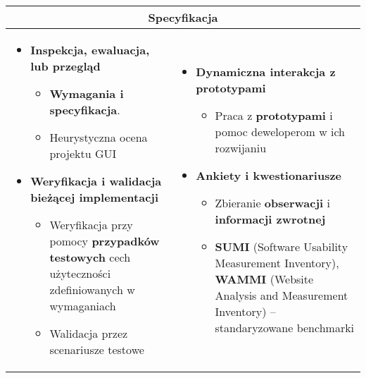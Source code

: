 \documentclass[../main.tex]{subfiles}
\begin{document}
    \begin{table}[H]
        \begin{center}
            \begin{tabular}{| p{8cm} | p{8cm} |}
                \hline
                \multicolumn{2}{|c|}{\textbf{Specyfikacja}} \\
                \hline
                \begin{itemize}
                    \item \textbf{Inspekcja, ewaluacja, lub przegląd}
                    \begin{itemize}
                        \item \textbf{Wymagania i specyfikacja}.
                        \item Heurystyczna ocena projektu GUI
                    \end{itemize}

                    \item \textbf{Weryfikacja i walidacja bieżącej implementacji}
                    \begin{itemize}
                        \item Weryfikacja przy pomocy \textbf{przypadków testowych} cech użyteczności
                        zdefiniowanych w wymaganiach
                        \item Walidacja przez scenariusze testowe
                    \end{itemize}
                \end{itemize}
                &
                \begin{itemize}
                    \item \textbf{Dynamiczna interakcja z prototypami}
                    \begin{itemize}
                        \item Praca z \textbf{prototypami} i pomoc deweloperom w ich rozwijaniu
                    \end{itemize}

                    \item \textbf{Ankiety i kwestionariusze}
                    \begin{itemize}
                        \item Zbieranie \textbf{obserwacji} i \textbf{informacji zwrotnej}
                        \item \textbf{SUMI} (Software Usability Measurement Inventory), \textbf{WAMMI} (Website Analysis and Measurement Inventory)
                        – standaryzowane benchmarki
                    \end{itemize}
                \end{itemize} \\
                \hline
            \end{tabular}
        \end{center}
    \end{table}
\end{document}
